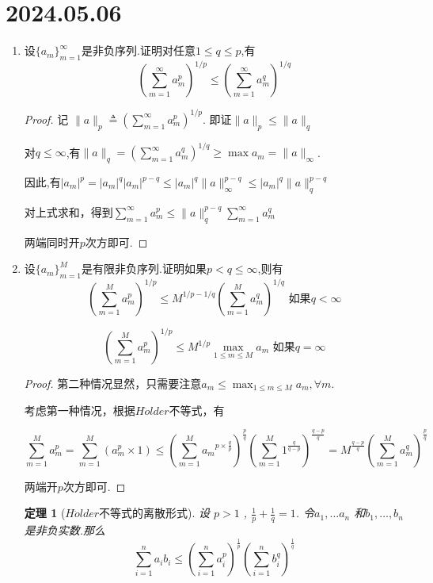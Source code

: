 \documentclass[12pt,a4paper]{article}
\newtheorem{theorem}{定理}
\begin{document}
	
	\noindent
	
	\section*{2024.05.06}	
	
	\begin{enumerate}
		\item 设$\{a_m\}_{m=1}^\infty$是非负序列.证明对任意$1\leq q\leq p$,有
		$$(\sum_{m=1}^\infty a_m^p)^{1/p}\leq(\sum_{m=1}^\infty a_m^q)^{1/q}$$
		
		\begin{proof}
			记 $\|a\|_p\triangleq (\sum_{m=1}^\infty a_m^p)^{1/p}$. 即证$\|a\|_p \leq \|a\|_q$
			
			对$q \leq \infty$,有$\|a\|_q = (\sum_{m=1}^\infty a_m^q)^{1/q} \geq \max a_m = \|a\|_\infty$.
			
			因此,有$|a_m|^p=|a_m|^q|a_m|^{p-q}\leq|a_m|^q  \|a\|_\infty^{p-q} \leq|a_m|^q\|a\|_q^{p-q}$
			
			对上式求和，得到$\sum_{m=1}^\infty a_m^p \leq \|a\|_q^{p-q} \sum_{m=1}^\infty a_m^q$
			
			两端同时开$p$次方即可.
		\end{proof}
		\item 设$\{a_m\}_{m=1}^M$是有限非负序列.证明如果$p<q\leq\infty$,则有
		$$(\sum_{m=1}^Ma_m^p)^{1/p}\leq M^{1/p-1/q}(\sum_{m=1}^Ma_m^q)^{1/q}\text{ 如果}q<\infty$$
		
		$$(\sum_{m=1}^Ma_m^p)^{1/p}\leq M^{1/p}\max_{1\leq m\leq M}a_m\text{ 如果}q=\infty $$
		
		\begin{proof}
			第二种情况显然，只需要注意$a_m \leq \max_{1\leq m\leq M}a_m, \forall m$.
			
			考虑第一种情况，根据$H\ddot{o}lder$不等式，有
			
			$$\sum_{m=1}^M a_m^p = \sum_{m=1}^M (a_m^p \times 1) \leq \left(\sum_{m=1}^M {a_m}^{p\times \frac{q}{p}}\right)^\frac{p}{q} \left(\sum_{m=1}^M 1^{\frac{q}{q-p}}\right)^{\frac{q-p}{q}}=M^{\frac{q-p}{q}} \left(\sum_{m=1}^M a_m^{q}\right)^\frac{p}{q}$$
			
			两端开$p$次方即可.
		\end{proof}
		
		\begin{theorem}[$H\ddot{o}lder$不等式的离散形式]
			设 $p>1$ , $\frac{1}{p}+\frac{1}{q}=1$. 令$a_1,\ldots a_n$ 和$b_1,\ldots,b_n$ 是非负实数.那么
			$$\sum_{i=1}^na_ib_i\leq\left(\sum_{i=1}^na_i^p\right)^{\frac1p}\left(\sum_{i=1}^nb_i^q\right)^{\frac1q}$$
		\end{theorem}
	\end{enumerate}
	
	
\end{document}
